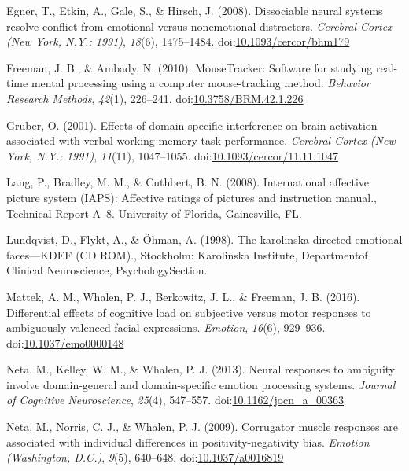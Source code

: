 \documentclass[man]{apa6}
\begin{document}
\leavevmode\hypertarget{ref-egner_dissociable_2008}{}%
Egner, T., Etkin, A., Gale, S., \& Hirsch, J. (2008). Dissociable neural systems resolve conflict from emotional versus nonemotional distracters. \emph{Cerebral Cortex (New York, N.Y.: 1991)}, \emph{18}(6), 1475--1484. doi:\href{https://doi.org/10.1093/cercor/bhm179}{10.1093/cercor/bhm179}

\leavevmode\hypertarget{ref-freeman_mousetracker:_2010}{}%
Freeman, J. B., \& Ambady, N. (2010). MouseTracker: Software for studying real-time mental processing using a computer mouse-tracking method. \emph{Behavior Research Methods}, \emph{42}(1), 226--241. doi:\href{https://doi.org/10.3758/BRM.42.1.226}{10.3758/BRM.42.1.226}

\leavevmode\hypertarget{ref-gruber_effects_2001}{}%
Gruber, O. (2001). Effects of domain-specific interference on brain activation associated with verbal working memory task performance. \emph{Cerebral Cortex (New York, N.Y.: 1991)}, \emph{11}(11), 1047--1055. doi:\href{https://doi.org/10.1093/cercor/11.11.1047}{10.1093/cercor/11.11.1047}

\leavevmode\hypertarget{ref-lang_international_2008}{}%
Lang, P., Bradley, M. M., \& Cuthbert, B. N. (2008). International affective picture system (IAPS): Affective ratings of pictures and instruction manual., Technical Report A--8. University of Florida, Gainesville, FL.

\leavevmode\hypertarget{ref-lundqvist_karolinska_1998}{}%
Lundqvist, D., Flykt, A., \& Öhman, A. (1998). The karolinska directed emotional faces---KDEF (CD ROM)., Stockholm: Karolinska Institute, Departmentof Clinical Neuroscience, PsychologySection.

\leavevmode\hypertarget{ref-mattek_differential_2016}{}%
Mattek, A. M., Whalen, P. J., Berkowitz, J. L., \& Freeman, J. B. (2016). Differential effects of cognitive load on subjective versus motor responses to ambiguously valenced facial expressions. \emph{Emotion}, \emph{16}(6), 929--936. doi:\href{https://doi.org/10.1037/emo0000148}{10.1037/emo0000148}

\leavevmode\hypertarget{ref-neta_neural_2013}{}%
Neta, M., Kelley, W. M., \& Whalen, P. J. (2013). Neural responses to ambiguity involve domain-general and domain-specific emotion processing systems. \emph{Journal of Cognitive Neuroscience}, \emph{25}(4), 547--557. doi:\href{https://doi.org/10.1162/jocn_a_00363}{10.1162/jocn\_a\_00363}

\leavevmode\hypertarget{ref-neta_corrugator_2009}{}%
Neta, M., Norris, C. J., \& Whalen, P. J. (2009). Corrugator muscle responses are associated with individual differences in positivity-negativity bias. \emph{Emotion (Washington, D.C.)}, \emph{9}(5), 640--648. doi:\href{https://doi.org/10.1037/a0016819}{10.1037/a0016819}
\end{document}
